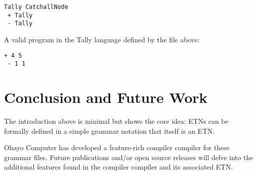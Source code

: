 \documentclass[journal]{IEEEtran}
\begin{document}
\begin{lstlisting}
Tally CatchallNode
 + Tally
 - Tally
\end{lstlisting}

A valid program in the Tally language defined by the file above:

\begin{lstlisting}
+ 4 5
 - 1 1
\end{lstlisting}

\section{Conclusion and Future Work}

The introduction above is minimal but shows the core idea: ETNs can be formally defined in a simple grammar notation that itself is an ETN.

Ohayo Computer has developed a feature-rich compiler compiler for these grammar files. Future publications and/or open source releases will delve into the additional features found in the compiler compiler and its associated ETN.
\end{document}
